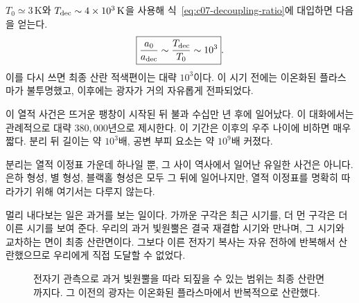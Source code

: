 \(T_0\simeq3\,\mathrm{K}\)와 \(T_{\rm dec}\sim4\times10^3\,\mathrm{K}\)을 사용해 식~\eqref{eq:c07-decoupling-ratio}에 대입하면 다음을 얻는다.
\begin{equation}
\boxed{
\frac{a_0}{a_{\rm dec}}
\sim
\frac{T_{\rm dec}}{T_0}
\sim10^3
}.
\label{eq:c07-decoupling-expansion}
\end{equation}
이를 다시 쓰면 최종 산란 적색편이는 대략 \(10^3\)이다. 이 시기 전에는 이온화된 플라스마가 불투명했고, 이후에는 광자가 거의 자유롭게 전파되었다.

이 열적 사건은 뜨거운 팽창이 시작된 뒤 불과 수십만 년 후에 일어났다. 이 대화에서는 관례적으로 대략 \(380{,}000\)년으로 제시한다. 이 기간은 이후의 우주 나이에 비하면 매우 짧다. 분리 뒤 길이는 약 \(10^3\)배, 공변 부피 요소는 약 \(10^9\)배 커졌다.

분리는 열적 이정표 가운데 하나일 뿐, 그 사이 역사에서 일어난 유일한 사건은 아니다. 은하 형성, 별 형성, 블랙홀 형성은 모두 그 뒤에 일어나지만, 열적 이정표를 명확히 따라가기 위해 여기서는 다루지 않는다.

멀리 내다보는 일은 과거를 보는 일이다. 가까운 구각은 최근 시기를, 더 먼 구각은 더 이른 시기를 보여 준다. 우리의 과거 빛원뿔은 결국 재결합 시기와 만나며, 그 시기와 교차하는 면이 최종 산란면이다. 그보다 이른 전자기 복사는 자유 전하에 반복해서 산란했으므로 우리에게 직접 도달할 수 없었다.

\begin{figure}[htbp]\centering
\begin{coursefitfigure}\end{coursefitfigure}\caption{전자기 관측으로 과거 빛원뿔을 따라 되짚을 수 있는 범위는 최종 산란면까지다. 그 이전의 광자는 이온화된 플라스마에서 반복적으로 산란했다.}\label{fig:c07-last-scattering}\end{figure}

\begin{classroomqa}
\end{classroomqa}

